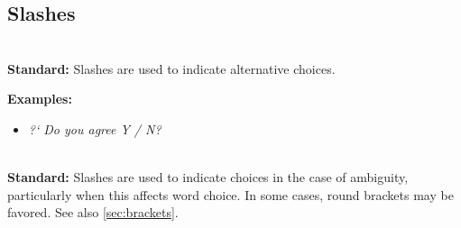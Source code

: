\documentclass{article}
\newcommand{\standard}[1]{\quad  \\ \textbf{Standard:} {#1}}
\newcommand{\examples}[1]{
\textbf{Examples:} \begin{itemize}
#1
\end{itemize}
}
\newcommand{\example}[1]{\item \textit{#1}}
\newcommand{\explanation}[1]{\textbf{Explanation:} #1}
\begin{document}
%
%
%
%
%

\subsection{Slashes}

\standard{Slashes are used to indicate alternative choices.}

\examples{
  \example{?` Do you agree Y / N?}
}

\standard{Slashes are used to indicate choices in the case of ambiguity,
particularly when this affects word choice. In some cases, round brackets may be
favored. See also \ref{sec:brackets}.}
\end{document}
